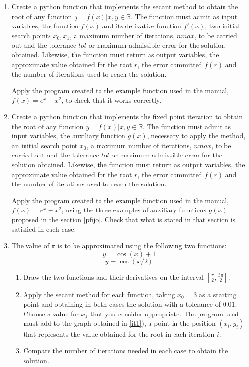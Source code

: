 \begin{enumerate}
\item Create a python function that implements the secant method to obtain the root of any function $y = f(x)\vert x, y \in \mathbb{R}$. The function must admit as input variables, the function $f(x)$ and its derivative function $f'(x)$, two initial search points $x_0,x_1$, a maximum number of iterations, $nmax$, to be carried out and the tolerance $tol$ or maximum admissible error for the solution obtained. Likewise, the function must return as output variables, the approximate value obtained for the root $r$, the error committed $f(r)$ and the number of iterations used to reach the solution.

Apply the program created to the example function used in the manual, $f(x) = e^x-x^2$, to check that it works correctly.

\item Create a python function that implements the fixed point iteration to obtain the root of any function $y = f(x)\vert x, y \in \mathbb{R}$. The function must admit as input variables, the auxiliary function $g(x)$, necessary to apply the method, an initial search point $x_0$, a maximum number of iterations, $nmax$, to be carried out and the tolerance $tol$ or maximum admissible error for the solution obtained. Likewise, the function must return as output variables, the approximate value obtained for the root $r$, the error committed $f(r)$ and the number of iterations used to reach the solution.

Apply the program created to the example function used in the manual, $f(x) = e^x-x^2$, using the three examples of auxiliary functions $g(x)$ proposed in the section \ref{pfijo}. Check that what is stated in that section is satisfied in each case.

\item The value of $\pi$ is to be approximated using the following two functions:
\begin{equation*}
y=\cos(x)+1
\end{equation*}
\begin{equation*}
y=\cos(x/2)
\end{equation*}
\begin{enumerate}
\item \label{it1}Draw the two functions and their derivatives on the interval $[\frac{\pi}{2},\frac{3\pi}{2}]$.
\item Apply the secant method for each function, taking $x_0=3$ as a starting point and obtaining in both cases the solution with a tolerance of $0.01$. Choose a value for $x_1$ that you consider appropriate.
The program used must add to the graph obtained in \ref{it1}), a point in the position $(x_i,y_i)$ that represents the value obtained for the root in each iteration $i$.
\item Compare the number of iterations needed in each case to obtain the solution.
\end{enumerate}


\end{enumerate}
